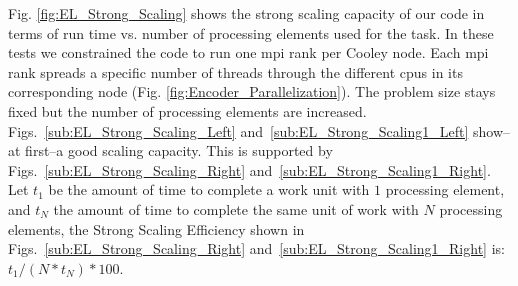 \documentclass[10pt,journal,compsoc]{IEEEtran}
\begin{document}
Fig. \ref{fig:EL_Strong_Scaling} shows the strong scaling capacity of our code in terms of run time vs. number of processing elements used for the task. In these tests we constrained the code to run one \gls{mpi} rank per Cooley node. Each \gls{mpi} rank spreads a specific number of threads through the different \glspl{cpu} in its corresponding node (Fig. \ref{fig:Encoder_Parallelization}). The problem size stays fixed but the number of processing elements are increased. Figs.~\ref{sub:EL_Strong_Scaling_Left} and~\ref{sub:EL_Strong_Scaling1_Left} show--at first--a good scaling capacity. This is supported by Figs.~\ref{sub:EL_Strong_Scaling_Right} and~\ref{sub:EL_Strong_Scaling1_Right}. Let $t_1$ be the amount of time to complete a work unit with $1$ processing element, and $t_N$ the amount of time to complete the same unit of work with $N$ processing elements, the Strong Scaling Efficiency shown in Figs.~\ref{sub:EL_Strong_Scaling_Right} and~\ref{sub:EL_Strong_Scaling1_Right} is: $t_1 / (N * t_N) * 100$.
\end{document}
